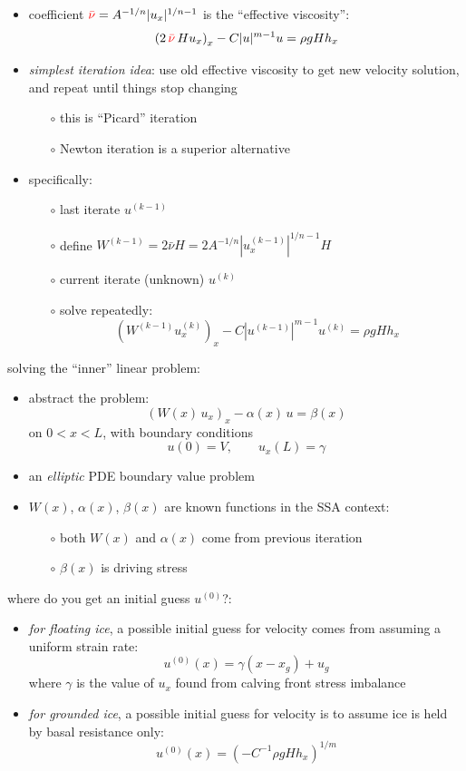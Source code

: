 \documentclass[titlepage,letterpaper,final,12pt]{scrartcl}
\begin{document}
\begin{itemize}
\item coefficient ${\color{red} \bar \nu} = A^{-1/n} |u_x|^{1/n-1}$ is the ``effective viscosity'':
   $$\left(2 \,{\color{red} \bar \nu}\, H u_x\right)_x - C |u|^{m-1} u = \rho g H h_x$$
\item \emph{simplest iteration idea}: use old effective viscosity to get new velocity solution, and repeat until things stop changing
  \begin{itemize}
  \item[$\circ$] this is ``Picard'' iteration
  \item[$\circ$] Newton iteration is a superior alternative
  \end{itemize}
\item specifically:
  \begin{itemize}
  \item[$\circ$] last iterate $u^{(k-1)}$
  \item[$\circ$] define $W^{(k-1)} = 2 \bar \nu H = 2 A^{-1/n} |u^{(k-1)}_x|^{1/n-1} H$
  \item[$\circ$] current iterate (unknown) $u^{(k)}$
  \item[$\circ$] solve repeatedly:
     $$\left(W^{(k-1)} u^{(k)}_x\right)_x - C |u^{(k-1)}|^{m-1} u^{(k)} = \rho g H h_x$$
  \end{itemize}
\end{itemize}

solving the ``inner'' linear problem:
\begin{itemize}
\item abstract the problem:
   $$\left(W(x)\, u_x\right)_x - \alpha(x)\, u = \beta(x)$$
on $0 < x < L$, with boundary conditions
   $$u(0) = V, \qquad  u_x(L) = \gamma$$
\item an \emph{elliptic} PDE boundary value problem
\item $W(x)$, $\alpha(x)$, $\beta(x)$ are known functions in the SSA context:
  \begin{itemize}
  \item[$\circ$] both $W(x)$ and $\alpha(x)$ come from previous iteration
  \item[$\circ$] $\beta(x)$ is driving stress
  \end{itemize}
\end{itemize}

where do you get an initial guess $u^{(0)}$?:

\begin{itemize}
\item \emph{for floating ice}, a possible initial guess for velocity comes from assuming a uniform strain rate:
   $$u^{(0)}(x) = \gamma (x-x_g) + u_g$$
where $\gamma$ is the value of $u_x$ found from calving front stress imbalance
\item \emph{for grounded ice}, a possible initial guess for velocity is to assume ice is held by basal resistance only:
   $$u^{(0)}(x) = \left(-C^{-1} \rho g H h_x\right)^{1/m}$$
\end{itemize}
\end{document}
